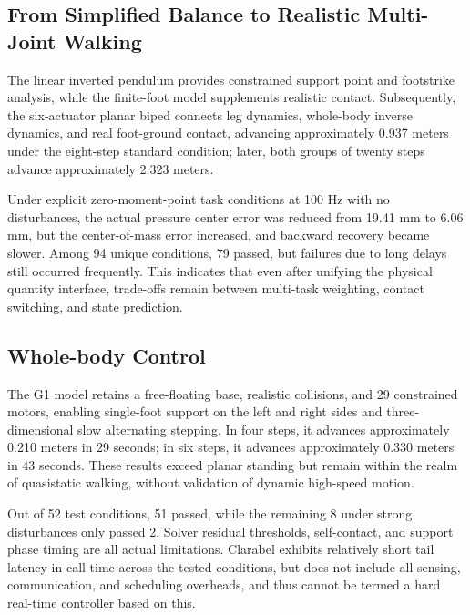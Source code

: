 \subsection{From Simplified Balance to Realistic Multi-Joint Walking}
The linear inverted pendulum provides constrained support point and footstrike analysis, while the finite-foot model supplements realistic contact. Subsequently, the six-actuator planar biped connects leg dynamics, whole-body inverse dynamics, and real foot-ground contact, advancing approximately 0.937 meters under the eight-step standard condition; later, both groups of twenty steps advance approximately 2.323 meters.

Under explicit zero-moment-point task conditions at 100 Hz with no disturbances, the actual pressure center error was reduced from 19.41 mm to 6.06 mm, but the center-of-mass error increased, and backward recovery became slower. Among 94 unique conditions, 79 passed, but failures due to long delays still occurred frequently. This indicates that even after unifying the physical quantity interface, trade-offs remain between multi-task weighting, contact switching, and state prediction.
\subsection{Whole-body Control}
The G1 model retains a free-floating base, realistic collisions, and 29 constrained motors, enabling single-foot support on the left and right sides and three-dimensional slow alternating stepping. In four steps, it advances approximately 0.210 meters in 29 seconds; in six steps, it advances approximately 0.330 meters in 43 seconds. These results exceed planar standing but remain within the realm of quasistatic walking, without validation of dynamic high-speed motion.

Out of 52 test conditions, 51 passed, while the remaining 8 under strong disturbances only passed 2. Solver residual thresholds, self-contact, and support phase timing are all actual limitations. Clarabel exhibits relatively short tail latency in call time across the tested conditions, but does not include all sensing, communication, and scheduling overheads, and thus cannot be termed a hard real-time controller based on this.
